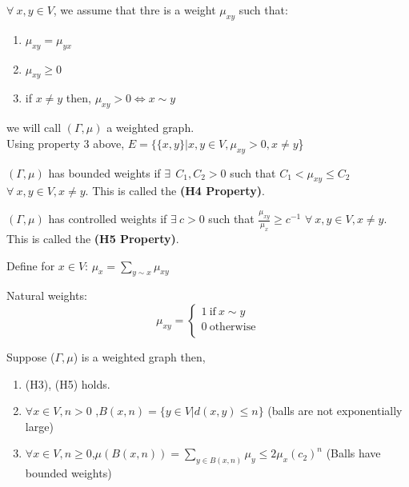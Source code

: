 \documentclass[main]{subfiles}
\begin{document}
\begin{definition}
  $\forall~ x,y \in V$, we assume that thre is a weight $\mu_{xy}$ such that:\\
  \begin{enumerate}
    \item $\mu_{xy}=\mu_{yx}$
    \item $\mu_{xy} \geq 0$
    \item  if $x\neq y$ then, $\mu_{xy}>0 \Leftrightarrow x \sim y$
  \end{enumerate}
  we will call $(\Gamma,\mu)$ a weighted graph. \\
  Using property 3 above, $E=\{\{x,y\} | x,y \in V, \mu_{xy}>0,x \neq y $\}\\
\end{definition}



\begin{definition}
  $(\Gamma,\mu)$ has bounded weights if $\exists~ \: C_{1},C_{2}>0$ such that $C_{1}<\mu_{xy} \leq C_{2}$ $\forall~ x,y \in V, x \neq y.$ This is called the
  \textbf{(H4 Property)}.\\
\end{definition}

\begin{definition}
  $(\Gamma,\mu)$ has controlled weights if $\exists~ c>0$ such that $\frac{\mu_{xy}}{\mu_x} \geq c^{-1}$ $\forall~ x,y \in V, x \neq y$. This is called the
  \textbf{(H5 Property)}.\\
\end{definition}



Define for $x \in V$:
$\mu_{x}= \sum_{y \sim x} \mu_{xy} $

\begin{definition}
  Natural weights:
  \begin{equation*}
    \mu_{xy}=
    \begin{cases}
      1 ~\mathrm{if}~ x \sim y \\
      0 ~\mathrm{otherwise}    \\
    \end{cases}
  \end{equation*}
\end{definition}


\begin{lemma} Suppose ($\Gamma,\mu$) is a weighted graph then,\\
  \begin{enumerate}

    \item (H3), (H5) holds.\\
    \item $\forall x \in V,n>0 $ ,$B(x,n) =\{ y \in V | d (x,y) \leq n \}$  (balls are not exponentially large)\\
    \item $\forall x \in V,n\geq 0$,$\mu (B(x,n)) = \sum_{y \in B(x,n)} \mu_{y} \leq 2 \mu_{x}(c_{2})^{n}$  (Balls have bounded weights)\\
  \end{enumerate}
\end{lemma}
\end{document}
